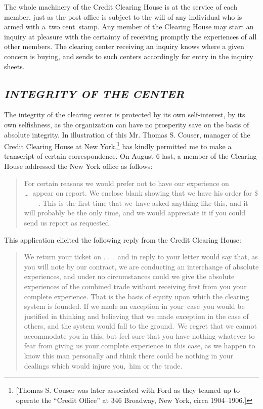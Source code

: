 \documentclass[twoside,symmetric,nobib,justified]{tufte-book}
\begin{document}
The whole machinery of the Credit Clearing House is at the service of
each member, just as the post office is subject to the will of any
individual who is armed with a~two cent~stamp. Any member of the
Clearing House may start an inquiry at pleasure with the certainty of
receiving promptly the experiences of all other members. The clearing
center receiving an inquiry knows where a given concern is buying, and
sends to such centers accordingly for entry in the inquiry sheets.~

\hypertarget{integrity-of-the-center}{%
\subsection{\texorpdfstring{\emph{INTEGRITY OF THE
CENTER}}{INTEGRITY OF THE CENTER}}\label{integrity-of-the-center}}

The integrity of the clearing center is protected by its own
self-interest, by its own selfishness, as the organization can have no
prosperity save on the basis of absolute integrity. In illustration of
this Mr. Thomas S. Couser, manager of the Credit Clearing House at New
York,\footnote{{[}Thomas S. Couser was later associated with Ford as
  they teamed up to operate the ``Credit Office'' at 346 Broadway, New
  York, circa 1904--1906.{]}} has kindly permitted me to make a
transcript of certain correspondence. On August 6 last, a member of the
Clearing House addressed the New York office as follows:~

\begin{quote}
For certain reasons we would prefer not to have our experience on \ldots~appear on report. We enclose blank showing that we have his order for
\$------. This is the first time that we~have asked anything like this,
and it will probably be the only time, and we would appreciate it if you
could send us report as requested.~
\end{quote}

This application elicited the following reply from the Credit Clearing
House:~~

\begin{quote}
We return your ticket on . . .~and in reply to your letter would say
that, as you will note by our contract, we are conducting an interchange
of absolute experiences, and under no circumstances could we give the
absolute experiences of the combined trade without receiving first from
you your complete experience. That is the basis of equity upon which the
clearing system is founded. If we made an exception in your~case~you
would be justified in thinking and believing that we made exception in
the case of others, and the system would fall to the ground.~We regret
that we cannot accommodate you in this, but feel sure that you have
nothing whatever to fear from giving us your complete experience in this
case, as we happen to know this man personally and think there could be
nothing in your dealings which would injure you,~him or the trade.~
\end{quote}
\end{document}
